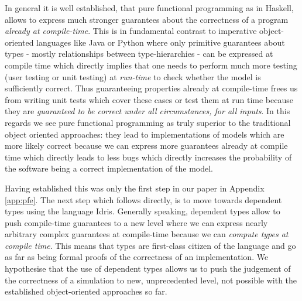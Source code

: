 In general it is well established, that pure functional programming as in Haskell, allows to express much stronger guarantees about the correctness of a program \textit{already at compile-time}. This is in fundamental contrast to imperative object-oriented languages like Java or Python where only primitive guarantees about types - mostly relationships between type-hierarchies - can be expressed at compile time which directly implies that one needs to perform much more testing (user testing or unit testing) at \textit{run-time} to check whether the model is sufficiently correct. Thus guaranteeing properties already at compile-time frees us from writing unit tests which cover these cases or test them at run time because they are \textit{guaranteed to be correct under all circumstances, for all inputs}. In this regards we see pure functional programming as truly superior to the traditional object oriented approaches: they lead to implementations of models which are more likely correct because we can express more guarantees already at compile time which directly leads to less bugs which directly increases the probability of the software being a correct implementation of the model.

Having established this was only the first step in our paper in Appendix \ref{app:pfe}. The next step which follows directly, is to move towards dependent types using the language Idris. Generally speaking, dependent types allow to push compile-time guarantees to a new level where we can express nearly arbitrary complex guarantees at compile-time because we can \textit{compute types at compile time}. This means that types are first-class citizen of the language and go as far as being formal proofs of the correctness of an implementation. We hypothesise that the use of dependent types allows us to push the judgement of the correctness of a simulation to new, unprecedented level, not possible with the established object-oriented approaches so far.